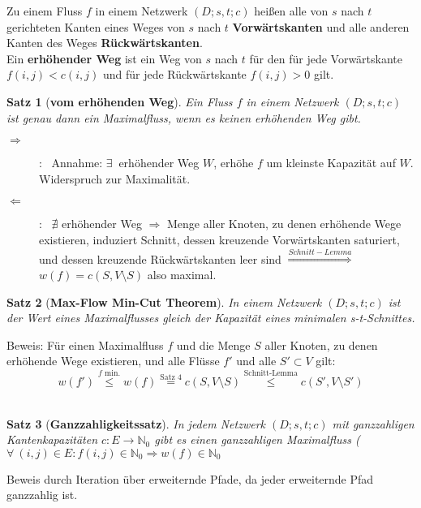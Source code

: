 \documentclass[a4paper,10pt]{scrartcl}
\newcommand{\tbf}{\textbf}
\newcommand{\Ra}{\Rightarrow}
\newcommand{\La}{\Leftarrow}
\newcommand{\natn}{\mathbb{N}_0}
\newcommand{\Gwfktg}{$c: E \rightarrow \mathbb{N}_0$ }
\newcommand{\Nw}{$(D;s,t;c)$ }
\newtheorem{satz}{Satz}
\begin{document}
Zu einem Fluss $f$ in einem Netzwerk \Nw heißen alle von $s$ nach $t$ gerichteten Kanten eines Weges von $s$ nach $t$ \tbf{Vorwärtskanten} und alle anderen Kanten des Weges \tbf{Rückwärtskanten}. \\

Ein \tbf{erhöhender Weg} ist ein Weg von $s$ nach $t$ für den für jede Vorwärtskante $f(i,j) < c(i,j)$ und für jede Rückwärtskante $f(i,j) > 0$ gilt. \\

\begin{satz}[\tbf{vom erhöhenden Weg}]
 Ein Fluss $f$ in einem Netzwerk \Nw ist genau dann ein Maximalfluss, wenn es keinen erhöhenden Weg gibt.
\end{satz}

\begin{description}
 \item[$\Ra$] : \ Annahme: $\exists \ $ erhöhender Weg $W$, erhöhe $f$ um kleinste Kapazität auf $W$. Widerspruch zur Maximalität.
 \item[$\La$] : \ $\nexists$ erhöhender Weg $\Ra$ Menge aller Knoten, zu denen erhöhende Wege existieren, induziert Schnitt, dessen kreuzende Vorwärtskanten saturiert, und dessen kreuzende Rückwärtskanten leer sind $\overset{Schnitt-Lemma}{\Longrightarrow}$ $w(f) = c(S,V \setminus S)$ also maximal.
\end{description}

\begin{satz}[\tbf{Max-Flow Min-Cut Theorem}]
 In einem Netzwerk \Nw ist der Wert eines Maximalflusses gleich der Kapazität eines minimalen s-t-Schnittes.
\end{satz}

Beweis: Für einen Maximalfluss $f$ und die Menge $S$ aller Knoten, zu denen erhöhende Wege existieren, und alle Flüsse $f'$ und alle $S' \subset V$ gilt: $$w(f') \overset{f \text{ min.}}{\leq} w(f) \overset{\text{Satz 4}}{=} c(S,V \setminus S) \overset{\text{Schnitt-Lemma}}{\leq} c(S',V \setminus S')$$ \\

\begin{satz}[\tbf{Ganzzahligkeitssatz}]
 In jedem Netzwerk \Nw mit ganzzahligen Kantenkapazitäten \Gwfktg gibt es einen ganzzahligen Maximalfluss ($\forall \ (i,j) \in E : f(i,j) \in \natn \Ra w(f) \in \natn$
\end{satz}

Beweis durch Iteration über erweiternde Pfade, da jeder erweiternde Pfad ganzzahlig ist. \\
\end{document}
